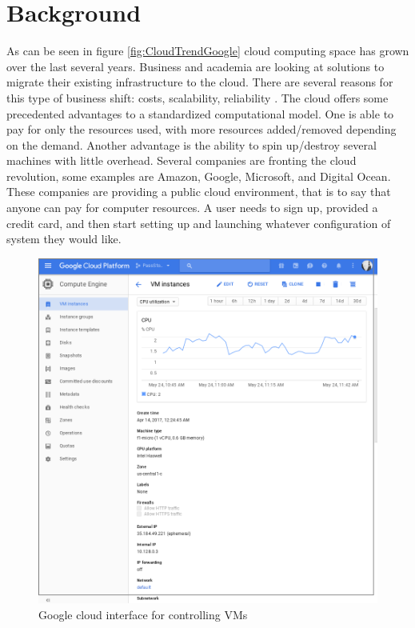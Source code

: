 \documentclass[12pt]{article}
\begin{document}
\section{Background}
As can be seen in figure \ref{fig:CloudTrendGoogle} cloud computing space has grown over the last several years. Business and academia are looking at solutions to migrate their existing infrastructure to the cloud. There are several reasons for this type of business shift: costs, scalability, reliability \cite{DillonWuChang}. The cloud offers some precedented advantages to a standardized computational model. One is able to pay for only the resources used, with more resources added/removed depending on the demand. Another advantage is the ability to spin up/destroy several machines with little overhead. Several companies are fronting the cloud revolution, some examples are Amazon\cite{amazonaws2017}, Google\cite{GoogleCloudCompute2017}, Microsoft\cite{Azure2017}, and Digital Ocean\cite{DigitalOcian2017}. These companies are providing a public cloud environment, that is to say that anyone can pay for computer resources. A user needs to sign up, provided a credit card, and then start setting up and launching whatever configuration of system they would like.

\begin{figure}[ht]
    \centering
    \includegraphics[scale=.2]{./pic/2017-05-24-114324_946x962_scrot.png}
    \caption{Google cloud interface for controlling VMs}
    \label{fig:GoogleInterface}
\end{figure}
\end{document}
